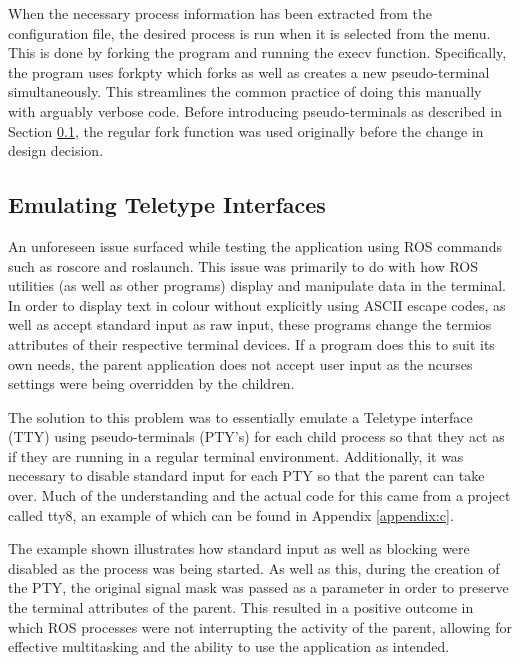 When the necessary process information has been extracted from the configuration file, the desired process is run when it is selected from the menu. This is done by forking the program and running the {\selectfont execv} function. Specifically, the program uses {\selectfont forkpty}\cite{forkpty} which forks as well as creates a new pseudo-terminal simultaneously. This streamlines the common practice of doing this manually with arguably verbose code. Before introducing pseudo-terminals as described in Section \ref{section:pty}, the regular {\selectfont fork} function was used originally before the change in design decision.

\subsection{Emulating Teletype Interfaces}
\label{section:pty}

An unforeseen issue surfaced while testing the application using {\selectfont ROS} commands such as {\selectfont roscore} and {\selectfont roslaunch}. This issue was primarily to do with how {\selectfont ROS} utilities (as well as other programs) display and manipulate data in the terminal. In order to display text in colour without explicitly using ASCII escape codes, as well as accept standard input as raw input, these programs change the {\selectfont termios} attributes of their respective terminal devices. If a program does this to suit its own needs, the parent application does not accept user input as the {\selectfont ncurses} settings were being overridden by the children.

The solution to this problem was to essentially emulate a Teletype interface {\selectfont (TTY)} using pseudo-terminals {\selectfont (PTY's)}\cite{pty} for each child process so that they act as if they are running in a regular terminal environment. Additionally, it was necessary to disable standard input for each {\selectfont PTY} so that the parent can take over. Much of the understanding and the actual code for this came from a project called {\selectfont tty8}\cite{tty8}, an example of which can be found in Appendix \ref{appendix:c}.

The example shown illustrates how standard input as well as blocking were disabled as the process was being started. As well as this, during the creation of the {\selectfont PTY}, the original signal mask was passed as a parameter in order to preserve the terminal attributes of the parent. This resulted in a positive outcome in which {\selectfont ROS} processes were not interrupting the activity of the parent, allowing for effective multitasking and the ability to use the application as intended.

